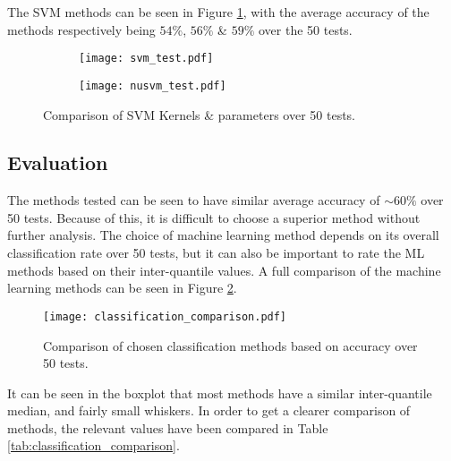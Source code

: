\documentclass[../main.tex]{subfiles}
\begin{document}
The \gls{SVM} methods can be seen in Figure \ref{fig:svm_test}, with the average accuracy of the methods respectively being $54\%$, $56\%$ \& $59\%$ over the 50 tests.

\begin{figure}[H]
    \centering
    \begin{subfigure}[b]{1\textwidth}
        \centering
\texttt{[image: svm\_test.pdf]}
    \end{subfigure}
    \centering
    \begin{subfigure}[b]{1\textwidth}
        \centering
\texttt{[image: nusvm\_test.pdf]}
    \end{subfigure}
    \caption{Comparison of \gls{SVM} Kernels \& parameters over 50 tests.}
\label{fig:svm_test}
\end{figure}

\subsection{Evaluation}

The methods tested can be seen to have similar average accuracy of $\sim 60\%$ over 50 tests.
Because of this, it is difficult to choose a superior method without further analysis.
The choice of machine learning method depends on its overall classification rate over 50 tests, but it can also be important to rate the ML methods based on their inter-quantile values.
A full comparison of the machine learning methods can be seen in Figure \ref{fig:classification_comparison}.

\begin{figure}[H]
\begin{center}
\texttt{[image: classification\_comparison.pdf]}
\caption{Comparison of chosen classification methods based on accuracy over 50 tests.}
\label{fig:classification_comparison}
\end{center}
\end{figure}

It can be seen in the boxplot that most methods have a similar inter-quantile median, and fairly small whiskers.
In order to get a clearer comparison of methods, the relevant values have been compared in Table \ref{tab:classification_comparison}.  
\end{document}
